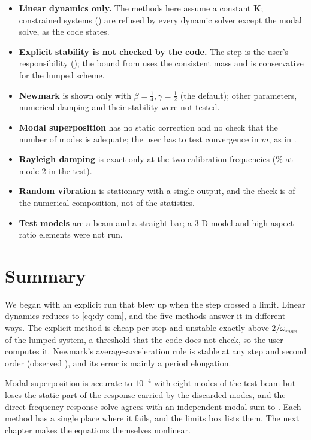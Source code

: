 \begin{limitsbox}
\begin{itemize}
\item \textbf{Linear dynamics only.} The methods here assume a constant $\bm K$; constrained systems () are refused by every dynamic solver except the modal solve, as the code states.
\item \textbf{Explicit stability is not checked by the code.} The step is the user's responsibility (); the bound from  uses the consistent mass and is conservative for the lumped scheme.
\item \textbf{Newmark} is shown only with $\beta=\tfrac14,\gamma=\tfrac12$ (the default); other parameters, numerical damping and their stability were not tested.
\item \textbf{Modal superposition} has no static correction and no check that the number of modes is adequate; the user has to test convergence in $m$, as in .
\item \textbf{Rayleigh damping} is exact only at the two calibration frequencies (\cdyRayleighMid{}\% at mode 2 in the test).
\item \textbf{Random vibration} is stationary with a single output, and the check is of the numerical composition, not of the statistics.
\item \textbf{Test models} are a beam and a straight bar; a 3-D model and high-aspect-ratio elements were not run.
\end{itemize}
\end{limitsbox}

\section{Summary}\label{sec:dy-summary}

We began with an explicit run that blew up when the step crossed a limit. Linear dynamics reduces to \eqref{eq:dy-eom}, and the five methods answer it in different ways. The explicit method is cheap per step and unstable exactly above $2/\omega_{max}$ of the lumped system, a threshold that the code does not check, so the user computes it. Newmark's average-acceleration rule is stable at any step and second order (observed \cdyNewmarkOrder), and its error is mainly a period elongation.

Modal superposition is accurate to $10^{-4}$ with eight modes of the test beam but loses the static part of the response carried by the discarded modes, and the direct frequency-response solve agrees with an independent modal sum to \cdyHarmDiff. Each method has a single place where it fails, and the limits box lists them. The next chapter makes the equations themselves nonlinear.

